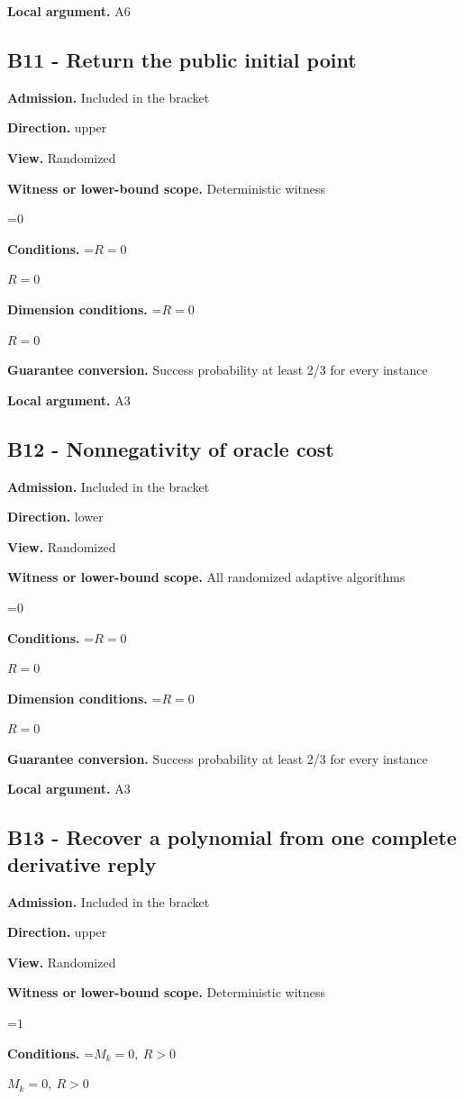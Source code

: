 \documentclass[10pt,a4paper]{article}
\newcommand{\AtlasMath}[1]{\par\begingroup\centering\setbox0=\hbox{$\displaystyle #1$}\ifdim\wd0>1.4\linewidth\typeout{ATLAS WIDE FORMULA: \the\wd0}\fi\ifdim\wd0>\linewidth\resizebox{\linewidth}{!}{\box0}\else\box0\fi\par\endgroup}
\newcommand{\AtlasInlineMath}[1]{\begingroup\setbox0=\hbox{$#1$}\ifdim\wd0>.4\linewidth\endgroup\AtlasMath{#1}\else\endgroup$#1$\fi}
\begin{document}
\textbf{Local argument.} A6

\subsection{B11 - Return the public initial point}
\textbf{Admission.} Included in the bracket

\textbf{Direction.} upper

\textbf{View.} Randomized

\textbf{Witness or lower-bound scope.} Deterministic witness

\AtlasMath{0}
\textbf{Conditions.} \AtlasInlineMath{R=0}

\textbf{Dimension conditions.} \AtlasInlineMath{R=0}

\textbf{Guarantee conversion.} Success probability at least 2/3 for every instance

\textbf{Local argument.} A3

\subsection{B12 - Nonnegativity of oracle cost}
\textbf{Admission.} Included in the bracket

\textbf{Direction.} lower

\textbf{View.} Randomized

\textbf{Witness or lower-bound scope.} All randomized adaptive algorithms

\AtlasMath{0}
\textbf{Conditions.} \AtlasInlineMath{R=0}

\textbf{Dimension conditions.} \AtlasInlineMath{R=0}

\textbf{Guarantee conversion.} Success probability at least 2/3 for every instance

\textbf{Local argument.} A3

\subsection{B13 - Recover a polynomial from one complete derivative reply}
\textbf{Admission.} Included in the bracket

\textbf{Direction.} upper

\textbf{View.} Randomized

\textbf{Witness or lower-bound scope.} Deterministic witness

\AtlasMath{1}
\textbf{Conditions.} \AtlasInlineMath{M_k=0,\ R>0}
\end{document}
